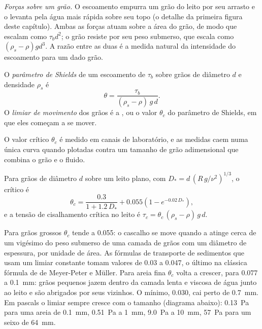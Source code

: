 \emph{Forças sobre um grão.} O escoamento empurra um grão do leito por seu arrasto e o levanta pela água mais rápida sobre seu topo (o detalhe da primeira figura deste capítulo). Ambas as forças atuam sobre a área do grão, de modo que escalam como $\tau_b
d^2$; o grão resiste por seu peso submerso, que escala como $(\rho_s - \rho) g d^3$. A razão entre as duas é a medida natural da intensidade do escoamento para um dado grão.

\begin{definition}\label{def:b1:erosion-transport:threshold}
O \emph{parâmetro de Shields} de um escoamento de  $\tau_b$ sobre grãos de diâmetro $d$ e densidade $\rho_s$ é
\[
  \theta = \frac{\tau_b}{(\rho_s - \rho)\,g\,d}.
\]
O \emph{limiar de movimento} dos grãos é a , ou o valor $\theta_c$ do parâmetro de Shields, em que eles começam a se mover.
\end{definition}

O valor crítico $\theta_c$ é medido em canais de laboratório, e as medidas caem numa única curva quando plotadas contra um tamanho de grão adimensional que combina o grão e o fluido.

\begin{proposition}\label{prop:b1:erosion-transport:soulsby}
Para grãos de diâmetro $d$ sobre um leito plano, com
$D_* = d\,\left(R\,g/\nu^2\right)^{1/3}$, o  crítico é
\[
  \theta_c = \frac{0.3}{1 + 1.2\,D_*} + 0.055\left(1 - e^{-0.02\,D_*}\right),
\]
e a tensão de cisalhamento crítica no leito é $\tau_c = \theta_c\,(\rho_s - \rho)\,g\,d$.
\end{proposition}
\admitted

Para grãos grossos $\theta_c$ tende a \num{0.055}: o cascalho se move quando a  atinge cerca de um vigésimo do peso submerso de uma camada de grãos com um diâmetro de espessura, por unidade de área. As fórmulas de transporte de sedimentos que usam um limiar constante tomam valores de \num{0.03} a \num{0.047}, o último na clássica fórmula de  de Meyer-Peter e Müller. Para areia fina $\theta_c$ volta a crescer, para \num{0.077} a \qty{0.1}{mm}: grãos pequenos jazem dentro da camada lenta e viscosa de água junto ao leito e são abrigados por seus vizinhos. O mínimo, \num{0.030}, cai perto de \qty{0.7}{mm}. Em pascals o limiar sempre cresce com o tamanho (diagrama abaixo): \qty{0.13}{Pa} para uma areia de \qty{0.1}{mm}, \qty{0.51}{Pa} a \qty{1}{mm}, \qty{9.0}{Pa} a \qty{10}{mm}, \qty{57}{Pa} para um seixo de \qty{64}{mm}.

